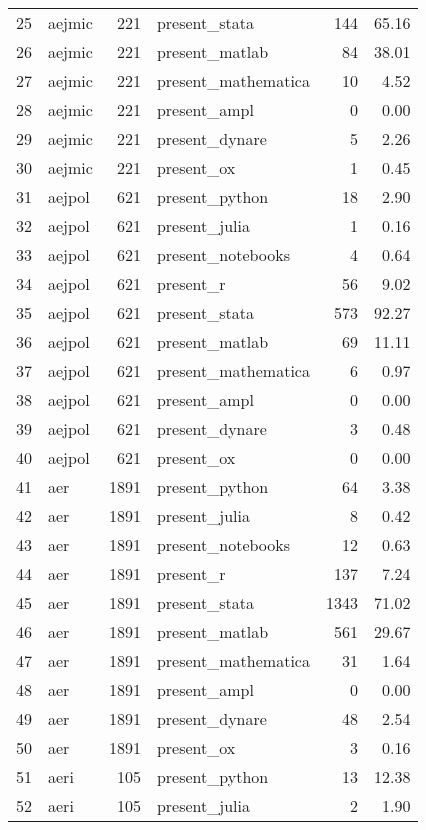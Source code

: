 \begin{table}[ht]
\begin{tabular}{rlrlrr}
  25 & aejmic & 221 & present\_stata & 144 & 65.16 \\ 
  26 & aejmic & 221 & present\_matlab &  84 & 38.01 \\ 
  27 & aejmic & 221 & present\_mathematica &  10 & 4.52 \\ 
  28 & aejmic & 221 & present\_ampl &   0 & 0.00 \\ 
  29 & aejmic & 221 & present\_dynare &   5 & 2.26 \\ 
  30 & aejmic & 221 & present\_ox &   1 & 0.45 \\ 
  31 & aejpol & 621 & present\_python &  18 & 2.90 \\ 
  32 & aejpol & 621 & present\_julia &   1 & 0.16 \\ 
  33 & aejpol & 621 & present\_notebooks &   4 & 0.64 \\ 
  34 & aejpol & 621 & present\_r &  56 & 9.02 \\ 
  35 & aejpol & 621 & present\_stata & 573 & 92.27 \\ 
  36 & aejpol & 621 & present\_matlab &  69 & 11.11 \\ 
  37 & aejpol & 621 & present\_mathematica &   6 & 0.97 \\ 
  38 & aejpol & 621 & present\_ampl &   0 & 0.00 \\ 
  39 & aejpol & 621 & present\_dynare &   3 & 0.48 \\ 
  40 & aejpol & 621 & present\_ox &   0 & 0.00 \\ 
  41 & aer & 1891 & present\_python &  64 & 3.38 \\ 
  42 & aer & 1891 & present\_julia &   8 & 0.42 \\ 
  43 & aer & 1891 & present\_notebooks &  12 & 0.63 \\ 
  44 & aer & 1891 & present\_r & 137 & 7.24 \\ 
  45 & aer & 1891 & present\_stata & 1343 & 71.02 \\ 
  46 & aer & 1891 & present\_matlab & 561 & 29.67 \\ 
  47 & aer & 1891 & present\_mathematica &  31 & 1.64 \\ 
  48 & aer & 1891 & present\_ampl &   0 & 0.00 \\ 
  49 & aer & 1891 & present\_dynare &  48 & 2.54 \\ 
  50 & aer & 1891 & present\_ox &   3 & 0.16 \\ 
  51 & aeri & 105 & present\_python &  13 & 12.38 \\ 
  52 & aeri & 105 & present\_julia &   2 & 1.90 \\ 

\end{tabular}
\end{table}
